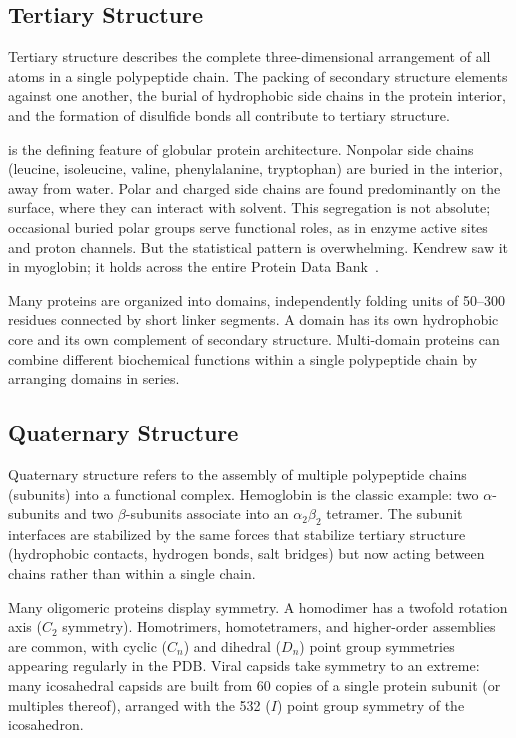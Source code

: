 \subsection{Tertiary Structure}
\label{sec:tertiary}

Tertiary structure describes the complete three-dimensional arrangement of all atoms in a single polypeptide chain.  The packing of secondary structure elements against one another, the burial of hydrophobic side chains in the protein interior, and the formation of disulfide bonds all contribute to tertiary structure.

 is the defining feature of globular protein architecture.  Nonpolar side chains (leucine, isoleucine, valine, phenylalanine, tryptophan) are buried in the interior, away from water.  Polar and charged side chains are found predominantly on the surface, where they can interact with solvent.  This segregation is not absolute; occasional buried polar groups serve functional roles, as in enzyme active sites and proton channels.  But the statistical pattern is overwhelming.  Kendrew saw it in myoglobin; it holds across the entire Protein Data Bank~\cite{burley2023}.

Many proteins are organized into domains, independently folding units of 50--300 residues connected by short linker segments.  A domain has its own hydrophobic core and its own complement of secondary structure.  Multi-domain proteins can combine different biochemical functions within a single polypeptide chain by arranging domains in series.

\subsection{Quaternary Structure}
\label{sec:quaternary}

Quaternary structure refers to the assembly of multiple polypeptide chains (subunits) into a functional complex.  Hemoglobin is the classic example: two $\alpha$-subunits and two $\beta$-subunits associate into an $\alpha_2\beta_2$ tetramer.  The subunit interfaces are stabilized by the same forces that stabilize tertiary structure (hydrophobic contacts, hydrogen bonds, salt bridges) but now acting between chains rather than within a single chain.

Many oligomeric proteins display symmetry.  A homodimer has a twofold rotation axis ($C_2$ symmetry).  Homotrimers, homotetramers, and higher-order assemblies are common, with cyclic ($C_n$) and dihedral ($D_n$) point group symmetries appearing regularly in the PDB.  Viral capsids take symmetry to an extreme: many icosahedral capsids are built from 60 copies of a single protein subunit (or multiples thereof), arranged with the 532 ($I$) point group symmetry of the icosahedron.

